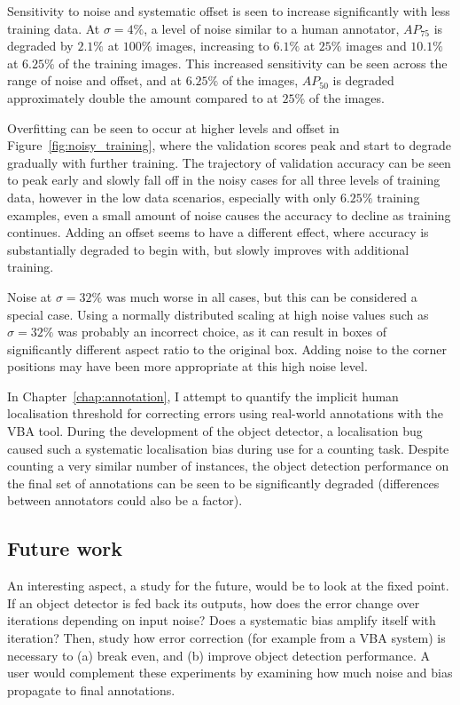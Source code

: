 Sensitivity to noise and systematic offset is seen to increase significantly with less training data. At $\sigma=4\%$, a level of noise similar to a human annotator, $AP_{75}$ is degraded by $2.1\%$ at $100\%$ images, increasing to $6.1\%$ at $25\%$ images and $10.1\%$ at $6.25\%$ of the training images. This increased sensitivity can be seen across the range of noise and offset, and at $6.25\%$ of the images, $AP_{50}$ is degraded approximately double the amount compared to at $25\%$ of the images.

Overfitting can be seen to occur at higher levels and offset in Figure~\ref{fig:noisy_training}, where the validation scores peak and start to degrade gradually with further training. The trajectory of validation accuracy can be seen to peak early and slowly fall off in the noisy cases for all three levels of training data, however in the low data scenarios, especially with only $6.25\%$ training examples, even a small amount of noise causes the accuracy to decline as training continues. Adding an offset seems to have a different effect, where accuracy is substantially degraded to begin with, but slowly improves with additional training.

Noise at $\sigma = 32\%$ was much worse in all cases, but this can be considered a special case. Using a normally distributed scaling at high noise values such as $\sigma = 32\%$ was probably an incorrect choice, as it can result in boxes of significantly different aspect ratio to the original box. Adding noise to the corner positions may have been more appropriate at this high noise level.

In Chapter~\ref{chap:annotation}, I attempt to quantify the implicit human localisation threshold for correcting errors using real-world annotations with the \gls{VBA} tool. During the development of the object detector, a localisation bug caused such a systematic localisation bias during use for a counting task. Despite counting a very similar number of instances, the object detection performance on the final set of annotations can be seen to be significantly degraded (differences between annotators could also be a factor).

\subsection{Future work}

An interesting aspect, a study for the future, would be to look at the fixed point. If an object detector is fed back its outputs, how does the error change over iterations depending on input noise? Does a systematic bias amplify itself with iteration? Then, study how error correction (for example from a \gls{VBA} system) is necessary to (a) break even, and (b) improve object detection performance. A user would complement these experiments by examining how much noise and bias propagate to final annotations.

